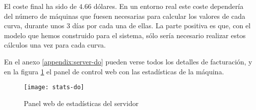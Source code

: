 El coste final ha sido de $4.66$ dólares. En un entorno real este coste dependería del número de máquinas que fuesen necesarias para calcular los valores de cada curva, durante unos 3 días por cada una de ellas. La parte positiva es que, con el modelo que hemos construido para el sistema, sólo sería necesario realizar estos cálculos una vez para cada curva.

En el anexo \ref{appendix:server-do} pueden verse todos los detalles de facturación, y en la figura \ref{fig:stats-do} el panel de control web con las estadísticas de la máquina.

\begin{figure}[h]
    \texttt{[image: stats-do]}
    \caption{Panel web de estadísticas del servidor}
    \label{fig:stats-do}
\end{figure}